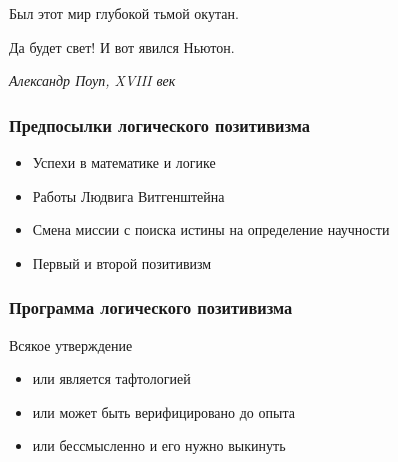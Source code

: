 \documentclass[aspectratio=169]{beamer}
\begin{document}






\begin{bframe}
\begin{center}
\begin{minipage}{10cm}
Был этот мир глубокой тьмой окутан.

Да будет свет! И вот явился Ньютон.

\begin{flushright}
{\it Александр Поуп, XVIII век}
\end{flushright}

\end{minipage}
\end{center}
\end{bframe}







\begin{bframe}\frametitle{Предпосылки логического позитивизма}
\begin{itemize}
\item<+-> Успехи в математике и логике
\item<+-> Работы Людвига Витгенштейна
\item<+-> Смена миссии с поиска истины на определение научности
\item<+-> Первый и второй позитивизм
\end{itemize}
\end{bframe}

\begin{bframe}\frametitle{Программа логического позитивизма}
Всякое утверждение
\begin{itemize}
\item<+-> или является тафтологией
\item<+-> или может быть верифицировано до опыта
\item<+-> или бессмысленно и его нужно выкинуть
\end{itemize}
\end{bframe}
\end{document}

